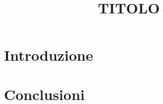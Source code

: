 \documentclass[12pt,oneside,letterpaper,english]{article}
\title{TITOLO} %
\begin{document}


\newpage
\doublespacing
\renewcommand{\baselinestretch}{1}\normalsize
\tableofcontents
\renewcommand{\baselinestretch}{1}\normalsize
\thispagestyle{fancy} %

\newpage
{} 



\section{Introduzione} \label{ch1}
 


\section{Conclusioni} \label{ch5}


\label{EndOfText}



\label{endOfDoc}
\end{document}
